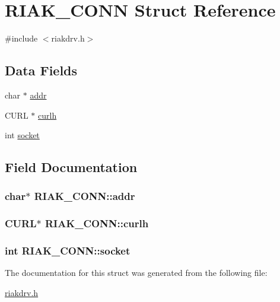 \hypertarget{structRIAK__CONN}{
\section{RIAK\_\-CONN Struct Reference}
\label{structRIAK__CONN}
}


{\ttfamily \#include $<$riakdrv.h$>$}

\subsection*{Data Fields}
\begin{DoxyCompactItemize}
\item 
char $\ast$ \hyperlink{structRIAK__CONN_acdbc16cd5909783c8a43996bcfedde74}{addr}
\item 
CURL $\ast$ \hyperlink{structRIAK__CONN_a0c48f72b62d6eb51a7449c6fb3d93e3f}{curlh}
\item 
int \hyperlink{structRIAK__CONN_a2e3f4865323a6a35ef1b2bdccaaef497}{socket}
\end{DoxyCompactItemize}


\subsection{Field Documentation}
\hypertarget{structRIAK__CONN_acdbc16cd5909783c8a43996bcfedde74}{
\subsubsection[{addr}]{\setlength{\rightskip}{0pt plus 5cm}char$\ast$ {\bf RIAK\_\-CONN::addr}}}
\label{structRIAK__CONN_acdbc16cd5909783c8a43996bcfedde74}
\hypertarget{structRIAK__CONN_a0c48f72b62d6eb51a7449c6fb3d93e3f}{
\subsubsection[{curlh}]{\setlength{\rightskip}{0pt plus 5cm}CURL$\ast$ {\bf RIAK\_\-CONN::curlh}}}
\label{structRIAK__CONN_a0c48f72b62d6eb51a7449c6fb3d93e3f}
\hypertarget{structRIAK__CONN_a2e3f4865323a6a35ef1b2bdccaaef497}{
\subsubsection[{socket}]{\setlength{\rightskip}{0pt plus 5cm}int {\bf RIAK\_\-CONN::socket}}}
\label{structRIAK__CONN_a2e3f4865323a6a35ef1b2bdccaaef497}


The documentation for this struct was generated from the following file:\begin{DoxyCompactItemize}
\item 
\hyperlink{riakdrv_8h}{riakdrv.h}\end{DoxyCompactItemize}
